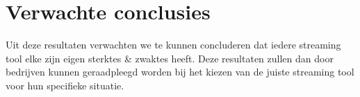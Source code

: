\section{Verwachte conclusies}
\label{sec:verwachte_conclusies}

Uit deze resultaten verwachten we te kunnen concluderen dat iedere streaming tool elke zijn eigen sterktes \& zwaktes heeft.
Deze resultaten zullen dan door bedrijven kunnen geraadpleegd worden bij het kiezen van de juiste streaming tool voor hun specifieke situatie.






